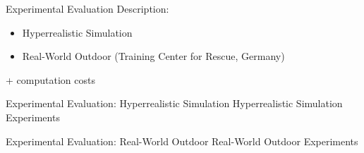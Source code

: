 \documentclass[10pt]{beamer}
\begin{document}
    \begin{frame}{Experimental Evaluation}
        Description:
        \begin{itemize}
            \item Hyperrealistic Simulation
            \item Real-World Outdoor (Training Center for Rescue, Germany)
        \end{itemize}
        + computation costs
    \end{frame}

    \begin{frame}{Experimental Evaluation: Hyperrealistic Simulation}
        Hyperrealistic Simulation Experiments
    \end{frame}

    \begin{frame}{Experimental Evaluation: Real-World Outdoor}
        Real-World Outdoor Experiments
    \end{frame}
\end{document}
